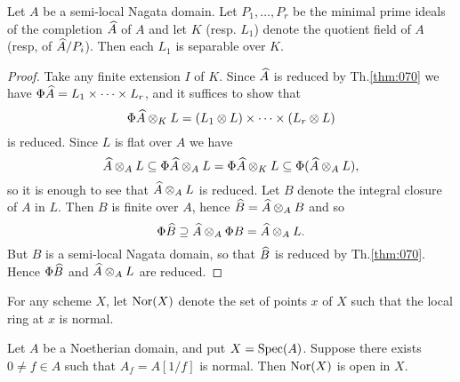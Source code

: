 \documentclass[../main]{subfiles}
\begin{document}
\begin{partheorem}\label{thm:071} Let $A$ be a semi-local Nagata domain. Let $P_1, \ldots, P_r$ be the minimal prime ideals of the completion $\widehat{A}$ of $A$ and let $K$ (resp. $L_1$) denote the quotient field of $A$ (resp, of $\widehat{A} / P_i$). Then each $L_1$ is separable over $K$.\end{partheorem}
\begin{proof}
Take any finite extension $I$ of $K$. Since $\widehat{A}$ is reduced by Th.\ref{thm:070} we have $\Phi \widehat{A}=L_1 \times \dots \times L_r$, and it suffices to show that \[\Phi \widehat{A} \otimes_K L=(L_1 \otimes L) \times \dots \times(L_r \otimes L)\] is
reduced. Since $L$ is flat over $A$ we have \[\widehat{A} \otimes_A L \subseteq \Phi \widehat{A} \otimes_A L= \Phi\widehat{A}\otimes_K L \subseteq \Phi(\widehat{A}\otimes_AL),\] 
so it is enough to see that $\widehat{A}\otimes_A L$
is reduced. Let $B$ denote the integral closure of $A$ in $L$.
Then $B$ is finite over $A$, hence $\widehat{B}=\widehat{A} \otimes_AB$ and so \[\Phi\widehat{B}\supseteq \widehat{A} \otimes_A \Phi B=\widehat{A} \otimes_A L.\] But $B$ is a semi-local Nagata domain, so
that $\widehat{B}$ is reduced by Th.\ref{thm:070}. Hence $\Phi \widehat{B}$ and $\widehat{A} \otimes_A L$ are
reduced.
\end{proof}

\newparagraph For any scheme $X$, let $\operatorname{Nor}(X)$ denote the set of points
$x$ of $X$ such that the local ring at $x$ is normal.

\begin{lemma}\label{lem:31.03}
Let $A$ be a Noetherian domain, and put $X=\operatorname{Spec}(A)$. Suppose there exists $0 \neq f \in A$ such that $A_{f}=A[1 / f]$ is normal. Then $\operatorname{Nor}(X)$ is open in $X$.
\end{lemma} 
\end{document}
